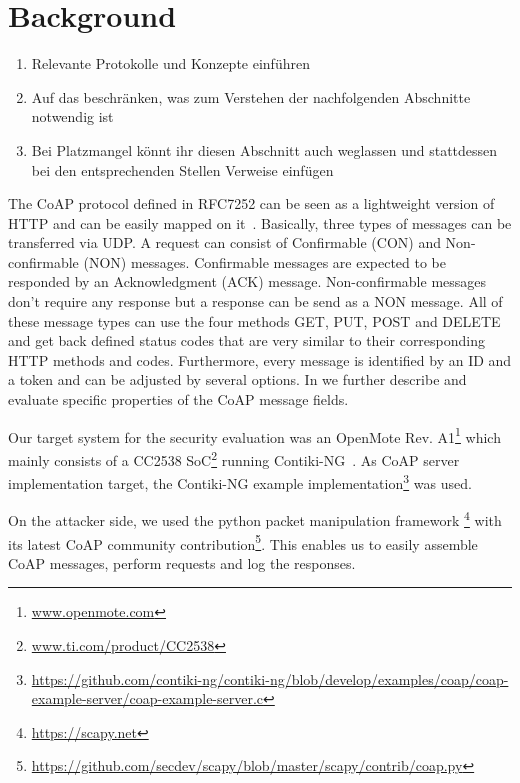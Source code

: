 \section{Background}
\label{section:background}

\begin{enumerate}
	\item Relevante Protokolle und Konzepte einführen
	\item Auf das beschränken, was zum Verstehen der nachfolgenden Abschnitte notwendig ist
	\item Bei Platzmangel könnt ihr diesen Abschnitt auch weglassen und stattdessen bei den entsprechenden Stellen Verweise einfügen
\end{enumerate}

The CoAP protocol defined in RFC7252 can be seen as a lightweight version of HTTP and can be easily mapped on it~\cite{RFC7252}. Basically, three types of messages can be transferred via UDP. A request can consist of Confirmable (CON) and Non-confirmable (NON) messages. Confirmable messages are expected to be responded by an Acknowledgment (ACK) message. Non-confirmable messages don't require any response but a response can be send as a NON message. All of these message types can use the four methods GET, PUT, POST and DELETE and get back defined status codes that are very similar to their corresponding HTTP methods and codes. Furthermore, every message is identified by an ID and a token and can be adjusted by several options. In  we further describe and evaluate specific properties of the CoAP message fields.

Our target system for the security evaluation was an OpenMote Rev. A1\footnote{\url{www.openmote.com}} which mainly consists of a CC2538 SoC\footnote{\url{www.ti.com/product/CC2538}} running Contiki-NG~\cite{contiki}. As CoAP server implementation target, the Contiki-NG example implementation\footnote{\url{https://github.com/contiki-ng/contiki-ng/blob/develop/examples/coap/coap-example-server/coap-example-server.c}} was used.

On the attacker side, we used the python packet manipulation framework \scapy\footnote{\url{https://scapy.net}} with its latest CoAP community contribution\footnote{\url{https://github.com/secdev/scapy/blob/master/scapy/contrib/coap.py}}. This enables us to easily assemble CoAP messages, perform requests and log the responses.

